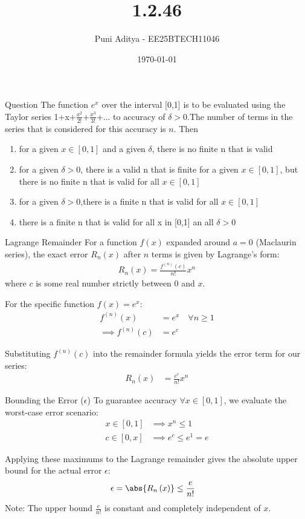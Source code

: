 \documentclass{beamer}
\title{1.2.46}
\author{Puni Aditya - EE25BTECH11046}
\date{\today}
\providecommand{\brak}[1]{\ensuremath{\left(#1\right)}}
\providecommand{\sbrak}[1]{\ensuremath{\left[#1\right]}}
\begin{document}
\begin{frame}
\titlepage
\end{frame}

\begin{frame}{Question}
The function $e^{x}$ over the interval [0,1] is to be evaluated using the Taylor series 1+x+$\frac{x^{2}}{2!}$+$\frac{x^{3}}{3!}$+... to accuracy of $\delta>0$.The number of terms in the series that is considered for this accuracy is $n$. Then
\begin{enumerate}
	\item for a given $x \in [0,1]$ and a given $\delta$, there is no finite n that is valid
    \item for a given $\delta > 0$, there is a valid n that is finite for a given $x \in[0,1] $, but there is no finite n that is valid for all $x \in[0,1]$
    \item for a given $\delta >0$,there is a finite n that is valid for all $x \in [0,1]$
    \item there is a finite n that is valid for all x in [0,1] an all $\delta >0$
\end{enumerate}
\end{frame}

\begin{frame}{Lagrange Remainder}
For a function $f\brak{x}$ expanded around $a=0$ (Maclaurin series), the exact error $R_n\brak{x}$ after $n$ terms is given by Lagrange's form:
\begin{align}
    R_n\brak{x} = \frac{f^{\brak{n}}\brak{c}}{n!} x^n
\end{align}
where $c$ is some real number strictly between $0$ and $x$.

For the specific function $f\brak{x} = e^x$:
\begin{align}
    f^{\brak{n}}\brak{x} &= e^x \quad \forall n \ge 1 \\
    \implies f^{\brak{n}}\brak{c} &= e^c
\end{align}

Substituting $f^{\brak{n}}\brak{c}$ into the remainder formula yields the error term for our series:
\begin{align}
    R_n\brak{x} &= \frac{e^c}{n!} x^n
\end{align}
\end{frame}

\begin{frame}{Bounding the Error ($\epsilon$)}
To guarantee accuracy $\forall x \in \sbrak{0, 1}$, we evaluate the worst-case error scenario:
\begin{align}
    x \in \sbrak{0,1} &\implies x^n \le 1 \\
    c \in \sbrak{0,x} &\implies e^c \le e^1 = e
\end{align}

Applying these maximums to the Lagrange remainder gives the absolute upper bound for the actual error $\epsilon$:
\begin{align}
    \epsilon &= \abs{R_n\brak{x}} \le \frac{e}{n!}
\end{align}
Note: The upper bound $\frac{e}{n!}$ is constant and completely independent of $x$.
\end{frame}
\end{document}
